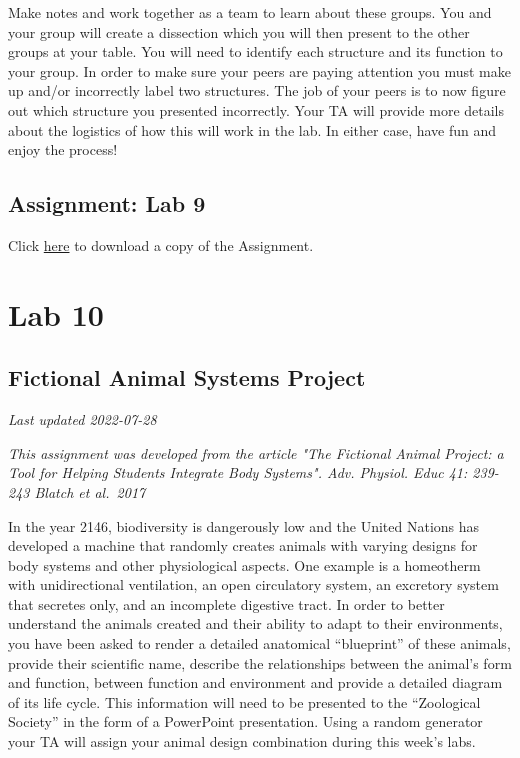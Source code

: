 \documentclass[
]{book}
\begin{document}
Make notes and work together as a team to learn about these groups. You and your group will create a dissection which you will then present to the other groups at your table. You will need to identify each structure and its function to your group. In order to make sure your peers are paying attention you must make up and/or incorrectly label two structures. The job of your peers is to now figure out which structure you presented incorrectly. Your TA will provide more details about the logistics of how this will work in the lab. In either case, have fun and enjoy the process!

\hypertarget{assignment-lab-9}{%
\chapter*{Assignment: Lab 9}\label{assignment-lab-9}}

Click \href{files/Lab9_Assignment.pdf}{here} to download a copy of the Assignment.

\hypertarget{part-lab-10}{%
\part*{Lab 10}\label{part-lab-10}}

\hypertarget{fictional-animal-systems-project}{%
\chapter*{Fictional Animal Systems Project}\label{fictional-animal-systems-project}}

\emph{Last updated 2022-07-28}

\emph{This assignment was developed from the article "The Fictional Animal Project: a Tool for Helping Students Integrate Body Systems". Adv. Physiol. Educ 41: 239-243 Blatch et al.~2017}

In the year 2146, biodiversity is dangerously low and the United Nations has developed a machine that randomly creates animals with varying designs for body systems and other physiological aspects. One example is a homeotherm with unidirectional ventilation, an open circulatory system, an excretory system that secretes only, and an incomplete digestive tract. In order to better understand the animals created and their ability to adapt to their environments, you have been asked to render a detailed anatomical ``blueprint'' of these animals, provide their scientific name, describe the relationships between the animal's form and function, between function and environment and provide a detailed diagram of its life cycle. This information will need to be presented to the ``Zoological Society'' in the form of a PowerPoint presentation. Using a random generator your TA will assign your animal design combination during this week's labs.
\end{document}
